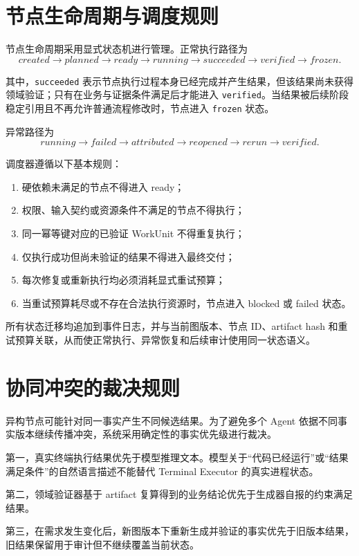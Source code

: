 \documentclass[UTF8,a4paper,12pt,oneside]{ctexbook}
\begin{document}
\section{节点生命周期与调度规则}

节点生命周期采用显式状态机进行管理。正常执行路径为
\[
created
\rightarrow
planned
\rightarrow
ready
\rightarrow
running
\rightarrow
succeeded
\rightarrow
verified
\rightarrow
frozen.
\]

其中，\texttt{succeeded} 表示节点执行过程本身已经完成并产生结果，但该结果尚未获得领域验证；只有在业务与证据条件满足后才能进入 \texttt{verified}。当结果被后续阶段稳定引用且不再允许普通流程修改时，节点进入 \texttt{frozen} 状态。

异常路径为
\[
running
\rightarrow
failed
\rightarrow
attributed
\rightarrow
reopened
\rightarrow
rerun
\rightarrow
verified.
\]

调度器遵循以下基本规则：

\begin{enumerate}
    \item 硬依赖未满足的节点不得进入 ready；
    \item 权限、输入契约或资源条件不满足的节点不得执行；
    \item 同一幂等键对应的已验证 WorkUnit 不得重复执行；
    \item 仅执行成功但尚未验证的结果不得进入最终交付；
    \item 每次修复或重新执行均必须消耗显式重试预算；
    \item 当重试预算耗尽或不存在合法执行资源时，节点进入 blocked 或 failed 状态。
\end{enumerate}

所有状态迁移均追加到事件日志，并与当前图版本、节点 ID、artifact hash 和重试预算关联，从而使正常执行、异常恢复和后续审计使用同一状态语义。


\section{协同冲突的裁决规则}

异构节点可能针对同一事实产生不同候选结果。为了避免多个 Agent 依据不同事实版本继续传播冲突，系统采用确定性的事实优先级进行裁决。

第一，真实终端执行结果优先于模型推理文本。模型关于“代码已经运行”或“结果满足条件”的自然语言描述不能替代 Terminal Executor 的真实进程状态。

第二，领域验证器基于 artifact 复算得到的业务结论优先于生成器自报的约束满足结果。

第三，在需求发生变化后，新图版本下重新生成并验证的事实优先于旧版本结果，旧结果保留用于审计但不继续覆盖当前状态。
\end{document}
